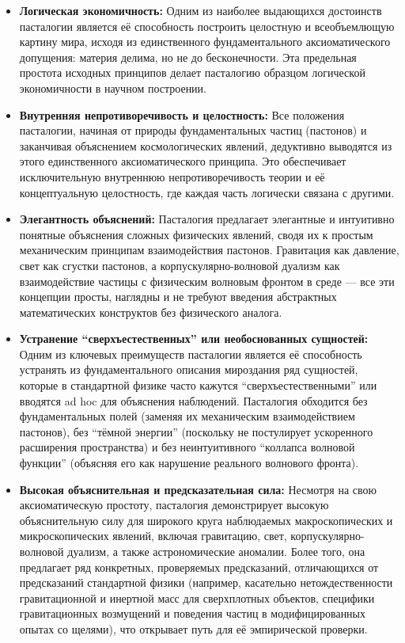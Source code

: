 \documentclass[pdflatex,sn-mathphys-num,referee]{sn-jnl}
\begin{document}
\begin{itemize}
    \item \textbf{Логическая экономичность:} Одним из наиболее выдающихся достоинств пасталогии является её способность построить целостную и всеобъемлющую картину мира, исходя из единственного фундаментального аксиоматического допущения: материя делима, но не до бесконечности. Эта предельная простота исходных принципов делает пасталогию образцом логической экономичности в научном построении.
    
    \item \textbf{Внутренняя непротиворечивость и целостность:} Все положения пасталогии, начиная от природы фундаментальных частиц (пастонов) и заканчивая объяснением космологических явлений, дедуктивно выводятся из этого единственного аксиоматического принципа. Это обеспечивает исключительную внутреннюю непротиворечивость теории и её концептуальную целостность, где каждая часть логически связана с другими.
    
    \item \textbf{Элегантность объяснений:} Пасталогия предлагает элегантные и интуитивно понятные объяснения сложных физических явлений, сводя их к простым механическим принципам взаимодействия пастонов. Гравитация как давление, свет как сгустки пастонов, а корпускулярно-волновой дуализм как взаимодействие частицы с физическим волновым фронтом в среде --- все эти концепции просты, наглядны и не требуют введения абстрактных математических конструктов без физического аналога.
    
    \item \textbf{Устранение ``сверхъестественных'' или необоснованных сущностей:} Одним из ключевых преимуществ пасталогии является её способность устранять из фундаментального описания мироздания ряд сущностей, которые в стандартной физике часто кажутся ``сверхъестественными'' или вводятся ad hoc для объяснения наблюдений. Пасталогия обходится без фундаментальных полей (заменяя их механическим взаимодействием пастонов), без ``тёмной энергии'' (поскольку не постулирует ускоренного расширения пространства) и без неинтуитивного ``коллапса волновой функции'' (объясняя его как нарушение реального волнового фронта).
    
    \item \textbf{Высокая объяснительная и предсказательная сила:} Несмотря на свою аксиоматическую простоту, пасталогия демонстрирует высокую объяснительную силу для широкого круга наблюдаемых макроскопических и микроскопических явлений, включая гравитацию, свет, корпускулярно-волновой дуализм, а также астрономические аномалии. Более того, она предлагает ряд конкретных, проверяемых предсказаний, отличающихся от предсказаний стандартной физики (например, касательно нетождественности гравитационной и инертной масс для сверхплотных объектов, специфики гравитационных возмущений и поведения частиц в модифицированных опытах со щелями), что открывает путь для её эмпирической проверки.
\end{itemize}
\end{document}
